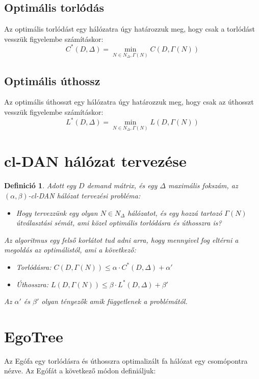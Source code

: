 \documentclass[12pt]{report}
\newtheorem{mydef}{Definició}
\begin{document}
\subsection{Optimális torlódás}


Az optimális torlódást egy  hálózatra úgy határozzuk meg, hogy csak a torlódást vesszük figyelembe számításkor: 
\[C^*(D, \Delta) = \min_{N \in N_\Delta, \Gamma(N)} C(D, \Gamma(N))\]


\subsection{Optimális úthossz}

Az optimális úthosszt egy  hálózatra úgy határozzuk meg, hogy csak az úthosszt vesszük figyelembe számításkor:
\[L^*(D, \Delta) = \min_{N \in N_\Delta, \Gamma(N)} L(D, \Gamma(N))\]

\section{cl-DAN hálózat tervezése}

\begin{mydef}
	Adott egy \(D\) demand mátrix, és egy \(\Delta\) maximális fokszám, az \((\alpha, \beta)\)-cl-DAN hálózat tervezési probléma:
	\begin{itemize}
		\item Hogy tervezzünk egy olyan \(N \in N_\Delta\) hálózatot, és egy hozzá tartozó \(\Gamma(N)\) útválasztási sémát, ami közel optimális torlódásra és úthosszra is?
	\end{itemize}
	
	Az algoritmus egy felső korlátot tud adni arra, hogy mennyivel fog eltérni a megoldás az optimálistól, ami a következő:
	\begin{itemize}
		\item Torlódásra: \(C(D, \Gamma(N)) \le \alpha \cdot C^*(D, \Delta) + \alpha'\)
		\item Úthosszra: \(L(D, \Gamma(N)) \le \beta \cdot L^*(D, \Delta) + \beta'\)
	\end{itemize}
	Az $\alpha'$ és $\beta'$ olyan tényezők amik függetlenek a problémától.
\end{mydef}

\section{EgoTree}

Az Egófa egy torlódásra és úthosszra optimalizált fa hálózat egy csomópontra nézve.
Az Egófát a következő módon definiáljuk:
	
\end{document}
